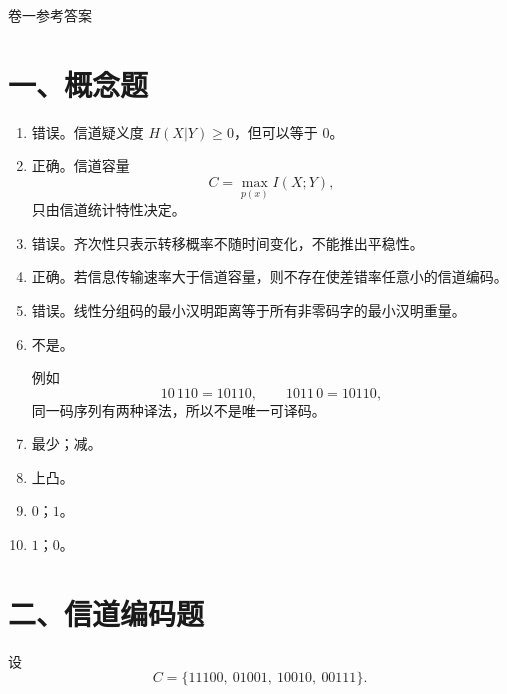 \documentclass[UTF8,a4paper,12pt]{ctexart}
\begin{document}
\vspace{1em}


\begin{center}
{\heiti{} 卷一参考答案}
\end{center}

\section*{一、概念题}

\begin{enumerate}[label=\arabic*., leftmargin=2em]
\item 错误。信道疑义度 $H(X|Y)\geq 0$，但可以等于 $0$。

\item 正确。信道容量
\[
C=\max_{p(x)}I(X;Y),
\]
只由信道统计特性决定。

\item 错误。齐次性只表示转移概率不随时间变化，不能推出平稳性。

\item 正确。若信息传输速率大于信道容量，则不存在使差错率任意小的信道编码。

\item 错误。线性分组码的最小汉明距离等于所有非零码字的最小汉明重量。

\item 不是。

例如
\[
10\,110=10110,\qquad 1011\,0=10110,
\]
同一码序列有两种译法，所以不是唯一可译码。

\item 最少；减。

\item 上凸。

\item $0$；$1$。

\item $1$；$0$。
\end{enumerate}

\section*{二、信道编码题}

设
\[
C=\{11100,\ 01001,\ 10010,\ 00111\}.
\]
\end{document}
